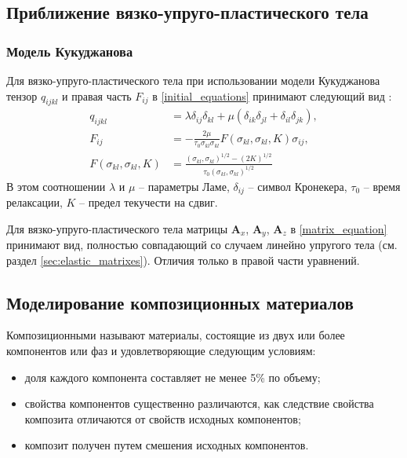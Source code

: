 \clearpage
\newpage

\subsection{Приближение вязко-упруго-пластического тела}

\subsubsection{Модель Кукуджанова}
\label{kukudzhanov_matrixes}

Для вязко-упруго-пластического тела при использовании модели Кукуджанова тензор $q_{ijkl}$ и правая часть $F_{ij}$ в \eqref{initial_equations} принимают следующий вид \cite{kukudzhanov, p21, p27}:
\begin{align}
\label{tensor_qijkl_kukudzhanov}
q_{ijkl}&=\lambda\delta_{ij}\delta_{kl}+\mu(\delta_{ik}\delta_{jl}+\delta_{il}
\delta_{jk}),\nonumber\\
F_{ij}&=-\frac{2\mu}{\tau_0\sigma_{kl}\sigma_{kl}} F(\sigma_{kl},\sigma_{kl},K)\sigma_{ij},\nonumber\\
F(\sigma_{kl},\sigma_{kl},K) &= \frac{(\sigma_{kl},\sigma_{kl})^{1/2}-(2K)^{1/2}}{\tau_0(\sigma_{kl},\sigma_{kl})^{1/2}}
\end{align}
В этом соотношении $\lambda$ и $\mu$ -- параметры Ламе, $\delta_{ij}$ -- символ Кронекера, $\tau_0$ -- время релаксации, $K$ -- предел текучести на сдвиг.

Для вязко-упруго-пластического тела матрицы $\mathbf{A}_x$, $\mathbf{A}_y$, $\mathbf{A}_z$ в \eqref{matrix_equation} принимают вид, полностью совпадающий со случаем линейно упругого тела (см. раздел \ref{sec:elastic_matrixes}). Отличия только в правой части уравнений.


\clearpage
\newpage

\subsection{Моделирование композиционных материалов}

Композиционными называют материалы, состоящие из двух или более компонентов или фаз и удовлетворяющие следующим условиям:
\begin{itemize}
\item доля каждого компонента составляет не менее 5\% по объему;
\item свойства компонентов существенно различаются, как следствие свойства композита отличаются от свойств исходных компонентов;
\item композит получен путем смешения исходных компонентов.
\end{itemize}

